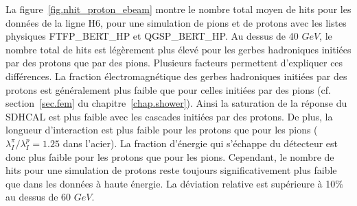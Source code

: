 La figure~\ref{fig.nhit_proton_ebeam} montre le nombre total moyen de hits pour les données de la ligne H6, pour une simulation de pions et de protons avec les listes physiques FTFP\_BERT\_HP et QGSP\_BERT\_HP. Au dessus de 40 $GeV$, le nombre total de hits est légèrement plus élevé pour les gerbes hadroniques initiées par des protons que par des pions. Plusieurs facteurs permettent d'expliquer ces différences. La fraction électromagnétique des gerbes hadroniques initiées par des protons est généralement plus faible que pour celles initiées par des pions (cf. section~\ref{sec.fem} du chapitre~\ref{chap.shower}). Ainsi la saturation de la réponse du SDHCAL est plus faible avec les cascades initiées par des protons. De plus, la longueur d'interaction est plus faible pour les protons que pour les pions ($\lambda_I^{\pi}/\lambda_I^p=1.25$ dans l'acier). La fraction d'énergie qui s'échappe du détecteur est donc plus faible pour les protons que pour les pions. Cependant, le nombre de hits pour une simulation de protons reste toujours significativement plus faible que dans les données à haute énergie. La déviation relative est supérieure à 10$\%$ au dessus de 60 $GeV$. 

